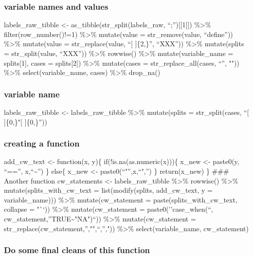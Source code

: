 \documentclass[
]{article}
\begin{document}
\hypertarget{variable-names-and-values}{%
\subsubsection{variable names and
values}\label{variable-names-and-values}}

labels\_raw\_tibble \textless- as\_tibble(str\_split(labels\_raw,
``;''){[}{[}1{]}{]}) \%\textgreater\% filter(row\_number()!=1)
\%\textgreater\% mutate(value = str\_remove(value, ``\nlabel define''))
\%\textgreater\% mutate(value = str\_replace(value, ``{[} {]}\{2,\}'',
``XXX'')) \%\textgreater\% mutate(splits = str\_split(value, ``XXX''))
\%\textgreater\% rowwise() \%\textgreater\% mutate(variable\_name =
splits{[}1{]}, cases = splits{[}2{]}) \%\textgreater\% mutate(cases =
str\_replace\_all(cases, ``'', "")) \%\textgreater\%
select(variable\_name, cases) \%\textgreater\% drop\_na()

\hypertarget{variable-name}{%
\subsubsection{variable name}\label{variable-name}}

labels\_raw\_tibble \textless- labels\_raw\_tibble \%\textgreater\%
mutate(splits = str\_split(cases, ``{[} {]}\{0,\}"{[} {]}\{0,\}''))

\hypertarget{creating-a-function}{%
\subsubsection{creating a function}\label{creating-a-function}}

add\_cw\_text \textless- function(x, y)\{ if(!is.na(as.numeric(x)))\{
x\_new \textless- paste0(y, ``=='', x,``\textasciitilde{}'') \} else\{
x\_new \textless- paste0(``"'',x,``",'') \} return(x\_new) \} \#\#\#
Another function cw\_statements \textless- labels\_raw\_tibble
\%\textgreater\% rowwise() \%\textgreater\%
mutate(splits\_with\_cw\_text = list(modify(splits, add\_cw\_text, y =
variable\_name))) \%\textgreater\% mutate(cw\_statement =
paste(splits\_with\_cw\_text, collapse = "``)) \%\textgreater\%
mutate(cw\_statement = paste0(''case\_when(``,
cw\_statement,''TRUE\textasciitilde"NA")``)) \%\textgreater\%
mutate(cw\_statement = str\_replace(cw\_statement,'',"",``,'',"))
\%\textgreater\% select(variable\_name, cw\_statement)

\hypertarget{do-some-final-cleans-of-this-function}{%
\subsubsection{Do some final cleans of this
function}\label{do-some-final-cleans-of-this-function}}
\end{document}
